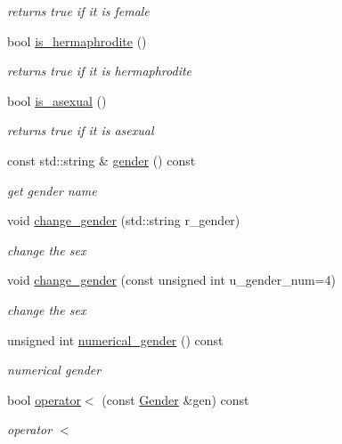\begin{DoxyCompactItemize}
\begin{DoxyCompactList}\small\item\em returns true if it is female \end{DoxyCompactList}\item 
\hypertarget{classGender_a5be5137cbbe3177d3934b78f23c19e87}{
bool \hyperlink{classGender_a5be5137cbbe3177d3934b78f23c19e87}{is\_\-hermaphrodite} ()}
\label{classGender_a5be5137cbbe3177d3934b78f23c19e87}

\begin{DoxyCompactList}\small\item\em returns true if it is hermaphrodite \end{DoxyCompactList}\item 
\hypertarget{classGender_ad1e9c77e0075959e59995ae5f0587695}{
bool \hyperlink{classGender_ad1e9c77e0075959e59995ae5f0587695}{is\_\-asexual} ()}
\label{classGender_ad1e9c77e0075959e59995ae5f0587695}

\begin{DoxyCompactList}\small\item\em returns true if it is asexual \end{DoxyCompactList}\item 
\hypertarget{classGender_a454a9f9b3605d4df6ad3125fbcb78dd2}{
const std::string \& \hyperlink{classGender_a454a9f9b3605d4df6ad3125fbcb78dd2}{gender} () const }
\label{classGender_a454a9f9b3605d4df6ad3125fbcb78dd2}

\begin{DoxyCompactList}\small\item\em get gender name \end{DoxyCompactList}\item 
void \hyperlink{classGender_a931859ed381f2adb1a5aa54f163db24c}{change\_\-gender} (std::string r\_\-gender)
\begin{DoxyCompactList}\small\item\em change the sex \end{DoxyCompactList}\item 
void \hyperlink{classGender_a74e44c24c4c8748aa9aa2a884a03e2a3}{change\_\-gender} (const unsigned int u\_\-gender\_\-num=4)
\begin{DoxyCompactList}\small\item\em change the sex \end{DoxyCompactList}\item 
unsigned int \hyperlink{classGender_ab1e46219176ba4a6b63fa3e0ce45d3b7}{numerical\_\-gender} () const 
\begin{DoxyCompactList}\small\item\em numerical gender \end{DoxyCompactList}\item 
\hypertarget{classGender_a9c20ed5c2c47837c2fce7686d42e0325}{
bool \hyperlink{classGender_a9c20ed5c2c47837c2fce7686d42e0325}{operator$<$} (const \hyperlink{classGender}{Gender} \&gen) const }
\label{classGender_a9c20ed5c2c47837c2fce7686d42e0325}

\begin{DoxyCompactList}\small\item\em operator $<$ \end{DoxyCompactList}\end{DoxyCompactItemize}
